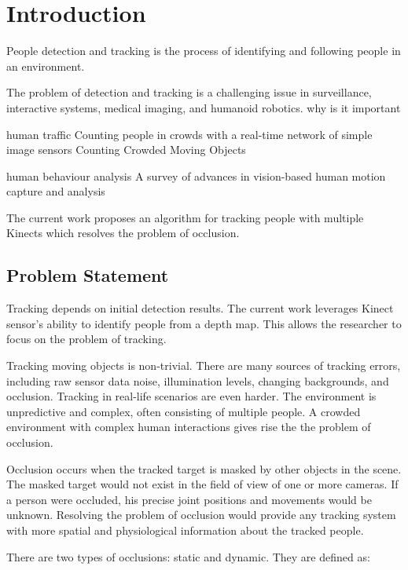 


\chapter{Introduction}

\label{chapter:introduction}

People detection and tracking is the process of identifying and following people in an environment. 

The problem of detection and tracking is a challenging issue in surveillance, interactive systems, medical imaging, and humanoid robotics. why is it important

human traffic
Counting people in crowds with a real-time network of simple image sensors
Counting Crowded Moving Objects

human behaviour analysis
A survey of advances in vision-based human
motion capture and analysis

The current work proposes an algorithm for tracking people with multiple Kinects which resolves the problem of occlusion.

\section{Problem Statement}
\label{sec:introduction_problem_statement}

Tracking depends on initial detection results. The current work leverages Kinect sensor's ability to identify people from a depth map. This allows the researcher to focus on the problem of tracking.

Tracking moving objects is non-trivial. There are many sources of tracking errors, including raw sensor data noise, illumination levels, changing backgrounds, and occlusion. Tracking in real-life scenarios are even harder. The environment is unpredictive and complex, often consisting of multiple people. A crowded environment with complex human interactions gives rise the the problem of occlusion.

Occlusion occurs when the tracked target is masked by other objects in the scene. The masked target would not exist in the field of view of one or more cameras. If a person were occluded, his precise joint positions and movements would be unknown. Resolving the problem of occlusion would provide any tracking system with more spatial and physiological information about the tracked people.

There are two types of occlusions: static and dynamic. They are defined as:

